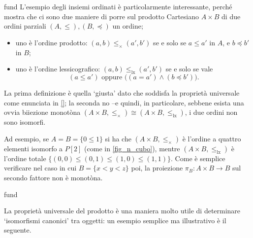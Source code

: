 \begin{hExample}{fund}
	L'esempio degli insiemi ordinati è particolarmente interessante, perché mostra che ci sono due maniere di porre sul prodotto Cartesiano \(A\times B\) di due ordini parziali \((A,\le), (B,\preceq)\) un ordine;
	\begin{itemize}
		\item uno è l'ordine prodotto: \((a,b)\le_\times (a',b')\) se e solo se \(a\le a'\) in \(A\), e \(b\preceq b'\) in \(B\);
		\item uno è l'ordine lessicografico: \((a,b)\le_\text{lx} (a',b')\) se e solo se vale
		      \[(a\le a') \text{ oppure } \bigl( (a=a') \land (b\preceq b') \bigr).\]
	\end{itemize}
	La prima definizione è quella `giusta' dato che soddisfa la proprietà universale come enunciata in \ref{}; la seconda no --e quindi, in particolare, sebbene esista una ovvia biiezione monotòna \((A\times B,\le_\times) \cong (A\times B,\le_\text{lx})\), i due ordini non sono isomorfi.

	Ad esempio, se \(A=B=\{0\le 1\}\) si ha che \((A\times B,\le_\times)\) è l'ordine a quattro elementi isomorfo a \(P[2]\) (come in \ref{fig_n_cubo}), mentre \((A\times B,\le_\text{lx})\) è l'ordine totale \(\{(0,0) \le (0,1) \le (1,0) \le (1,1)\}\). Come è semplice verificare nel caso in cui \(B=\{x<y<z\}\) poi, la proiezione \(\pi_B \colon A\times B \to B\) sul secondo fattore non è monotòna.
\end{hExample}
\begin{hExample}{fund}
\end{hExample}
La proprietà universale del prodotto è una maniera molto utile di determinare `isomorfismi canonici' tra oggetti: un esempio semplice ma illustrativo è il seguente.
